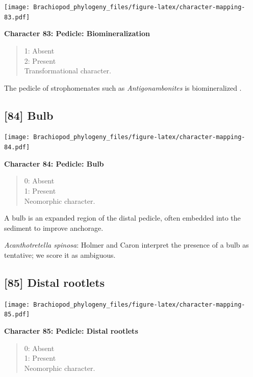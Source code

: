 \documentclass[]{book}
\theoremstyle{definition}
\theoremstyle{definition}
\theoremstyle{definition}
\theoremstyle{remark}
\begin{document}
\texttt{[image: Brachiopod\_phylogeny\_files/figure-latex/character-mapping-83.pdf]}

\textbf{Character 83: Pedicle: Biomineralization}

\begin{quote}
1: Absent\\
2: Present\\
Transformational character.
\end{quote}

The pedicle of strophomenates such as \emph{Antigonambonites} is
biomineralized \citep{Holmer2018Evolutionarysignificance}.

\hypertarget{bulb}{%
\subsection*{{[}84{]} Bulb}\label{bulb}}

\texttt{[image: Brachiopod\_phylogeny\_files/figure-latex/character-mapping-84.pdf]}

\textbf{Character 84: Pedicle: Bulb}

\begin{quote}
0: Absent\\
1: Present\\
Neomorphic character.
\end{quote}

A bulb is an expanded region of the distal pedicle, often embedded into
the sediment to improve anchorage.

\emph{Acanthotretella spinosa}: Holmer and Caron
\citeyearpar{Holmer2006Aspinose} interpret the presence of a bulb as
tentative; we score it as ambiguous.

\hypertarget{distal-rootlets}{%
\subsection*{{[}85{]} Distal rootlets}\label{distal-rootlets}}

\texttt{[image: Brachiopod\_phylogeny\_files/figure-latex/character-mapping-85.pdf]}

\textbf{Character 85: Pedicle: Distal rootlets}

\begin{quote}
0: Absent\\
1: Present\\
Neomorphic character.
\end{quote}
\end{document}
